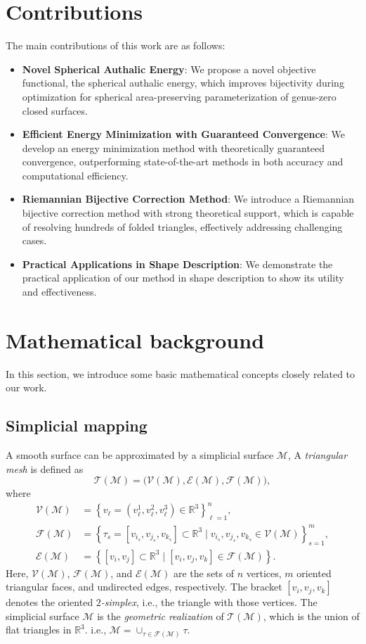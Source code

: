 \documentclass{article}
\numberwithin{equation}{section}
\def\R{\mathbb{R}}
\def\E{\mathcal{E}}
\def\F{\mathcal{F}}
\def\M{\mathcal{M}}
\def\T{\mathcal{T}}
\def\V{\mathcal{V}}
\begin{document}
\section{Contributions}
\label{sec:1.2}
The main contributions of this work are as follows:
\begin{itemize}
\item[(i)] \textbf{Novel Spherical Authalic Energy}: 
We propose a novel objective functional, the spherical authalic energy, which improves bijectivity during optimization for spherical area-preserving parameterization of genus-zero closed surfaces.
\item[(ii)] \textbf{Efficient Energy Minimization with Guaranteed Convergence}: 
We develop an energy minimization method with theoretically guaranteed convergence, outperforming state-of-the-art methods in both accuracy and computational efficiency.
\item[(iii)] \textbf{Riemannian Bijective Correction Method}: 
We introduce a Riemannian bijective correction method with strong theoretical support, which is capable of resolving hundreds of folded triangles, effectively addressing challenging cases.
\item[(iv)] \textbf{Practical Applications in Shape Description}:
We demonstrate the practical application of our method in shape description to show its utility and effectiveness.
\end{itemize}

\section{Mathematical background}
\label{sec:2}
In this section, we introduce some basic mathematical concepts closely related to our work. 

\subsection{Simplicial mapping}
A smooth surface can be approximated by a simplicial surface $\M$, A \textit{triangular mesh} is defined as 
$$
\T(\M) = \big(\V(\M), \E(\M), \F(\M) \big),
$$
where
\begin{align*}
\V(\M) &= \left\{ v_\ell = (v_\ell^1, v_\ell^2, v_\ell^3) \in\R^3 \right\}_{\ell=1}^n, \\[4pt]
\F(\M) &= \left\{ \tau_s = [ {v}_{i_s}, {v}_{j_s}, {v}_{k_s} ] \subset\R^3 \mid {v}_{i_s}, {v}_{j_s}, {v}_{k_s}\in\V(\M) \right\}_{s=1}^m, \\[4pt]
\E(\M) &= \left\{ [v_i,v_j] \subset\R^3 \mid [v_i,v_j,v_k]\in\F(\M)  \right\}.
\end{align*}
Here, $\V(\M)$, $\F(\M)$, and $\E(\M)$ are the sets of $n$ vertices, $m$ oriented triangular faces, and undirected edges, respectively. The bracket $[{v}_{i}, {v}_{j}, {v}_{k}]$ denotes the oriented \textit{$2$-simplex}, i.e., the triangle with those vertices.
The simplicial surface $\M$ is the \textit{geometric realization} of $\T(\M)$, which is the union of flat triangles in $\R^3$. i.e., $\M = \cup_{\tau\in\F(\M)} \tau$.
\end{document}
